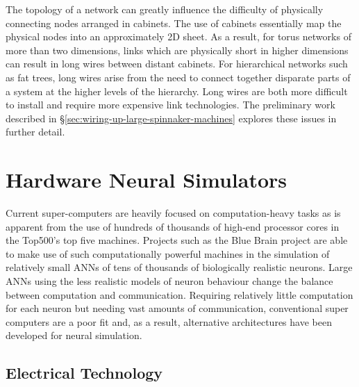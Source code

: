 			The topology of a network can greatly influence the difficulty of
			physically connecting nodes arranged in cabinets. The use of cabinets
			essentially map the physical nodes into an approximately 2D sheet. As a
			result, for torus networks of more than two dimensions, links which are
			physically short in higher dimensions can result in long wires between
			distant cabinets. For hierarchical networks such as fat trees, long wires
			arise from the need to connect together disparate parts of a system at the
			higher levels of the hierarchy. Long wires are both more difficult to
			install and require more expensive link technologies. The preliminary work
			described in \S\ref{sec:wiring-up-large-spinnaker-machines} explores these
			issues in further detail.
			
			
	
	\section{Hardware Neural Simulators}
		
		
		Current super-computers are heavily focused on computation-heavy tasks as is
		apparent from the use of hundreds of thousands of high-end processor cores
		in the Top500's top five machines. Projects such as the Blue Brain project
		\cite{markram06} are able to make use of such computationally powerful
		machines in the simulation of relatively small ANNs of tens of thousands of
		biologically realistic neurons. Large ANNs using the less realistic models
		of neuron behaviour change the balance between computation and
		communication.  Requiring relatively little computation for each neuron but
		needing vast amounts of communication, conventional super computers are a
		poor fit and, as a result, alternative architectures have been developed for
		neural simulation.
		
		\subsection{Electrical Technology}
		
